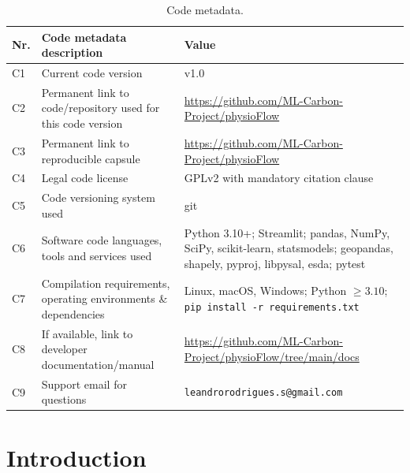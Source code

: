 \documentclass[a4paper,fleqn]{cas-dc}
\begin{document}
\begin{table}[t]
\centering
\footnotesize
\begin{tabular}{|l|p{4.7cm}|p{6.3cm}|}
\hline
\textbf{Nr.} & \textbf{Code metadata description} & \textbf{Value} \\
\hline
C1 & Current code version & v1.0 \\
\hline
C2 & Permanent link to code/repository used for this code version & \url{https://github.com/ML-Carbon-Project/physioFlow} \\
\hline
C3 & Permanent link to reproducible capsule & \url{https://github.com/ML-Carbon-Project/physioFlow} \\
\hline
C4 & Legal code license & GPLv2 with mandatory citation clause \\
\hline
C5 & Code versioning system used & git \\
\hline
C6 & Software code languages, tools and services used & Python 3.10+; Streamlit; pandas, NumPy, SciPy, scikit-learn, statsmodels; geopandas, shapely, pyproj, libpysal, esda; pytest \\
\hline
C7 & Compilation requirements, operating environments \& dependencies & Linux, macOS, Windows; Python $\geq 3.10$; \texttt{pip install -r requirements.txt} \\
\hline
C8 & If available, link to developer documentation/manual & \url{https://github.com/ML-Carbon-Project/physioFlow/tree/main/docs} \\
\hline
C9 & Support email for questions & \texttt{leandrorodrigues.s@gmail.com} \\
\hline
\end{tabular}
\caption{Code metadata.}
\label{tbl:metadata}
\end{table}

\section{Introduction}\label{sec:intro}
\end{document}
